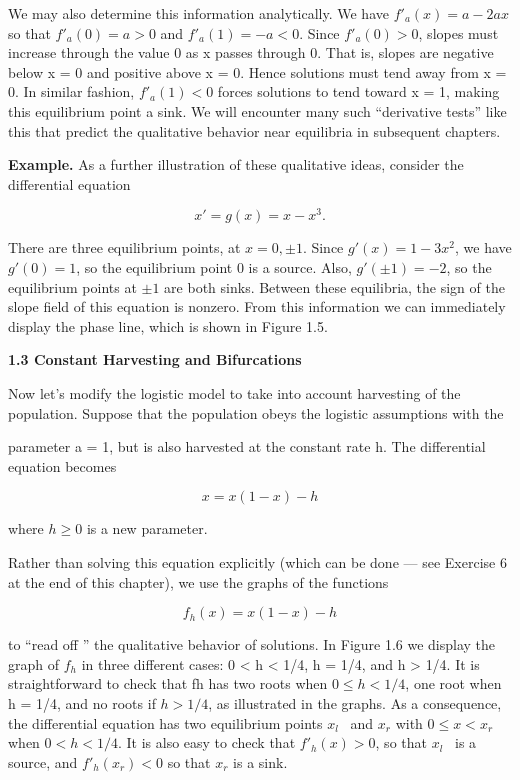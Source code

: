 \documentclass{article}
\begin{document}
We may also determine this information analytically. We have $f'_a(x)=a-2ax$ so that $f'_a(0) = a > 0$ and $f'_a(1) = -a < 0$. Since $f'_a(0) > 0$, slopes must increase through the value 0 as x passes through 0. That is, slopes are
negative below x = 0 and positive above x = 0. Hence solutions must tend
away from x = 0. In similar fashion, $f'_a(1) < 0$ forces solutions to tend toward
x = 1, making this equilibrium point a sink. We will encounter many such
“derivative tests” like this that predict the qualitative behavior near equilibria
in subsequent chapters.

\textbf{Example.} As a further illustration of these qualitative ideas, consider the
differential equation

\[
x' = g (x) = x - x^3.
\]


There are three equilibrium points, at $x = 0, \pm 1$. Since $g'(x) = 1 - 3x^2$, we have $g'(0) = 1$, so the equilibrium point 0 is a source. Also, $g'(\pm 1) = -2$, so the equilibrium points at $\pm 1$ are both sinks. Between these equilibria, the sign of the slope field of this equation is nonzero. From this information we can immediately display the phase line, which is shown in Figure 1.5.  

\hfill

\textbf{1.3 Constant Harvesting and
Bifurcations}

\hfill

Now let’s modify the logistic model to take into account harvesting of the population.
Suppose that the population obeys the logistic assumptions with the

parameter a = 1, but is also harvested at the constant rate h. The differential
equation becomes

\[
x  = x(1 - x) - h
\]

where $h \geq 0$ is a new parameter.

Rather than solving this equation explicitly (which can be done — see
Exercise 6 at the end of this chapter), we use the graphs of the functions

\[
f_h(x) = x(1 - x) - h
\]

to “read off ” the qualitative behavior of solutions. In Figure 1.6 we display
the graph of $f_h$ in three different cases: 0 < h < 1/4, h = 1/4, and h > 1/4.
It is straightforward to check that fh has two roots when $0 \leq h < 1/4$, one
root when h = 1/4, and no roots if $h > 1/4$, as illustrated in the graphs. As a
consequence, the differential equation has two equilibrium points $x_l$  and $x_r$
with $0 \leq x  < x_r$ when $0 < h < 1/4$. It is also easy to check that $f'_h (x) > 0$, so
that $x_l$  is a source, and $f'_h (x_r) < 0$ so that $x_r$ is a sink.
\end{document}
